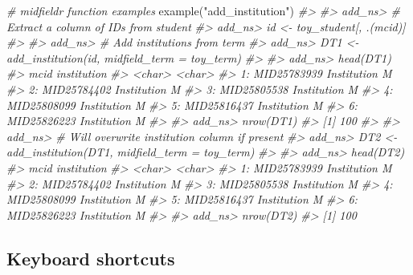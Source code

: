 \documentclass[
]{book}
\newenvironment{Shaded}{\begin{snugshade}}{\end{snugshade}}
\newcommand{\CommentTok}[1]{\textcolor[rgb]{0.56,0.35,0.01}{\textit{#1}}}
\newcommand{\FunctionTok}[1]{\textcolor[rgb]{0.00,0.00,0.00}{#1}}
\newcommand{\NormalTok}[1]{#1}
\newcommand{\StringTok}[1]{\textcolor[rgb]{0.31,0.60,0.02}{#1}}
\begin{document}
\begin{Shaded}
\begin{Highlighting}[]
\CommentTok{\# midfieldr function examples}
\FunctionTok{example}\NormalTok{(}\StringTok{"add\_institution"}\NormalTok{)}
\CommentTok{\#\textgreater{} }
\CommentTok{\#\textgreater{} add\_ns\textgreater{} \# Extract a column of IDs from student}
\CommentTok{\#\textgreater{} add\_ns\textgreater{} id \textless{}{-} toy\_student[, .(mcid)]}
\CommentTok{\#\textgreater{} }
\CommentTok{\#\textgreater{} add\_ns\textgreater{} \# Add institutions from term}
\CommentTok{\#\textgreater{} add\_ns\textgreater{} DT1 \textless{}{-} add\_institution(id, midfield\_term = toy\_term)}
\CommentTok{\#\textgreater{} }
\CommentTok{\#\textgreater{} add\_ns\textgreater{} head(DT1)}
\CommentTok{\#\textgreater{}           mcid   institution}
\CommentTok{\#\textgreater{}         \textless{}char\textgreater{}        \textless{}char\textgreater{}}
\CommentTok{\#\textgreater{} 1: MID25783939 Institution M}
\CommentTok{\#\textgreater{} 2: MID25784402 Institution M}
\CommentTok{\#\textgreater{} 3: MID25805538 Institution M}
\CommentTok{\#\textgreater{} 4: MID25808099 Institution M}
\CommentTok{\#\textgreater{} 5: MID25816437 Institution M}
\CommentTok{\#\textgreater{} 6: MID25826223 Institution M}
\CommentTok{\#\textgreater{} }
\CommentTok{\#\textgreater{} add\_ns\textgreater{} nrow(DT1)}
\CommentTok{\#\textgreater{} [1] 100}
\CommentTok{\#\textgreater{} }
\CommentTok{\#\textgreater{} add\_ns\textgreater{} \# Will overwrite institution column if present}
\CommentTok{\#\textgreater{} add\_ns\textgreater{} DT2 \textless{}{-} add\_institution(DT1, midfield\_term = toy\_term)}
\CommentTok{\#\textgreater{} }
\CommentTok{\#\textgreater{} add\_ns\textgreater{} head(DT2)}
\CommentTok{\#\textgreater{}           mcid   institution}
\CommentTok{\#\textgreater{}         \textless{}char\textgreater{}        \textless{}char\textgreater{}}
\CommentTok{\#\textgreater{} 1: MID25783939 Institution M}
\CommentTok{\#\textgreater{} 2: MID25784402 Institution M}
\CommentTok{\#\textgreater{} 3: MID25805538 Institution M}
\CommentTok{\#\textgreater{} 4: MID25808099 Institution M}
\CommentTok{\#\textgreater{} 5: MID25816437 Institution M}
\CommentTok{\#\textgreater{} 6: MID25826223 Institution M}
\CommentTok{\#\textgreater{} }
\CommentTok{\#\textgreater{} add\_ns\textgreater{} nrow(DT2)}
\CommentTok{\#\textgreater{} [1] 100}
\end{Highlighting}
\end{Shaded}

\hypertarget{keyboard-shortcuts}{%
\subsection{Keyboard shortcuts}\label{keyboard-shortcuts}}
\end{document}
